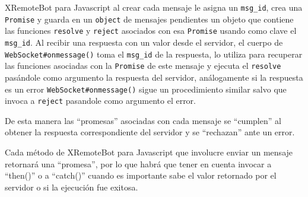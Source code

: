 XRemoteBot para Javascript al crear cada mensaje le asigna un \texttt{msg\_id},
crea una \texttt{Promise} y guarda en un \texttt{object} de mensajes
pendientes un objeto que contiene las funciones \texttt{resolve} y
\texttt{reject} asociados con esa \texttt{Promise}
usando como clave el \texttt{msg\_id}. Al recibir una respuesta
con un valor
desde el servidor, el cuerpo de \texttt{WebSocket\#onmessage()} toma el
\texttt{msg\_id} de la respuesta, lo utiliza para recuperar las funciones
asociadas con la \texttt{Promise} de este mensaje y ejecuta el
\texttt{resolve} pasándole como argumento la respuesta del servidor,
análogamente si la respuesta es un error \texttt{WebSocket\#onmessage()}
sigue un procedimiento similar salvo que invoca a \texttt{reject}
pasandole como argumento el error.

De esta manera las ``promesas'' asociadas con cada
mensaje se ``cumplen'' al obtener la respuesta correspondiente del servidor
y se ``rechazan'' ante un error.

Cada método de XRemoteBot para Javascript que involucre enviar un mensaje
retornará una ``promesa'', por lo que habrá que tener en cuenta
invocar a ``then()'' o a ``catch()'' cuando es importante
sabe el valor retornado por el servidor o si la ejecución fue exitosa.

